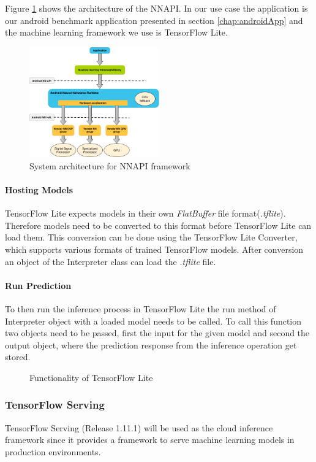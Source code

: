 Figure \ref{fig:NNAPIarchitecture} shows the architecture of the NNAPI. In our use case the application is our android benchmark application presented in section \ref{chap:androidApp} and the machine learning framework we use is TensorFlow Lite.
\begin{figure}[!htb]
\centering
\includegraphics[width=0.5\textwidth]{./Bilder/nnapi_architecture.png}
\caption{System architecture for NNAPI framework \cite{NNAPI}}
\label{fig:NNAPIarchitecture}
\end{figure}


\paragraph{Hosting Models}
TensorFlow Lite expects models in their own \emph{FlatBuffer} file  format(\emph{.tflite}). Therefore models need to be converted to this format before TensorFlow Lite can load them. This conversion can be done using the TensorFlow Lite Converter, which supports various formats of trained TensorFlow models.
After conversion an object of the Interpreter class can load the \emph{.tflite} file.
\paragraph{Run Prediction}

To then run the inference process in TensorFlow Lite the run method of Interpreter object with a loaded model needs to be called. To call this function two objects need to be passed, first the input for the given model and second the output object, where the prediction response from the inference operation get stored. 
\begin{figure}[H]
\centering

\caption{Functionality of TensorFlow Lite}
\label{fig:edge}
\end{figure}
\subsubsection{TensorFlow Serving}
\label{chap:TFServing}
TensorFlow Serving (Release 1.11.1) will be used as the cloud inference framework since it provides a framework to serve machine learning models in production environments. 



